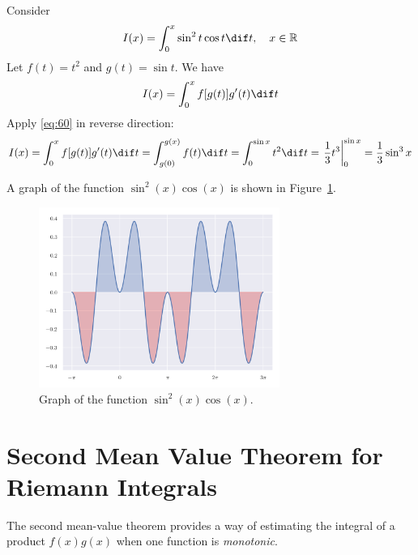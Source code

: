 \documentclass[thmcnt=section, color=blue, 12pt]{my-elegantbook}
\begin{document}
\begin{example}
	Consider
	\begin{align*}
		I(x) = \int_0^x \sin^2 t \cos t \dif t, \quad x \in \R
	\end{align*}
	Let $f(t) = t^2$ and $g(t) = \sin t$.
	We have
	\begin{align*}
		I(x) = \int_0^x f[g(t)] g^\prime(t) \dif t
	\end{align*}
	Apply \eqref{eq:60} in reverse direction:
	\begin{align*}
		I(x) = \int_0^x f[g(t)] g^\prime(t) \dif t
		= \int_{g(0)}^{g(x)} f(t) \dif t
		= \int_0^{\sin x} t^2 \dif t
		= \left . \frac{1}{3} t^3 \right\rvert_{0}^{\sin x}
		= \frac{1}{3} \sin^3 x
	\end{align*}

	A graph of the function $\sin^2(x) \cos(x)$ is shown in Figure~\ref{fig:11}.
	\begin{figure}[H]
		\centering
		\includegraphics[width=0.7\textwidth]{figures/change-of-variables-in-a-riemann-integral-example-1.png}
		\caption{Graph of the function $\sin^2(x) \cos(x)$.}
		\label{fig:11}
	\end{figure}
\end{example}



\section{Second Mean Value Theorem for Riemann Integrals}

The second mean-value theorem provides a way of estimating the
integral of a product $f(x) g(x)$ when one function is \textit{monotonic}.
\end{document}
